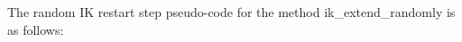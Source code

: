 \documentclass[conference]{IEEEtran} \usepackage[T1]{fontenc} \usepackage[backend=biber, style=ieee]{biblatex}
\begin{document}
The random IK restart step pseudo-code for the method ik\_extend\_randomly is as follows:

\end{document}
